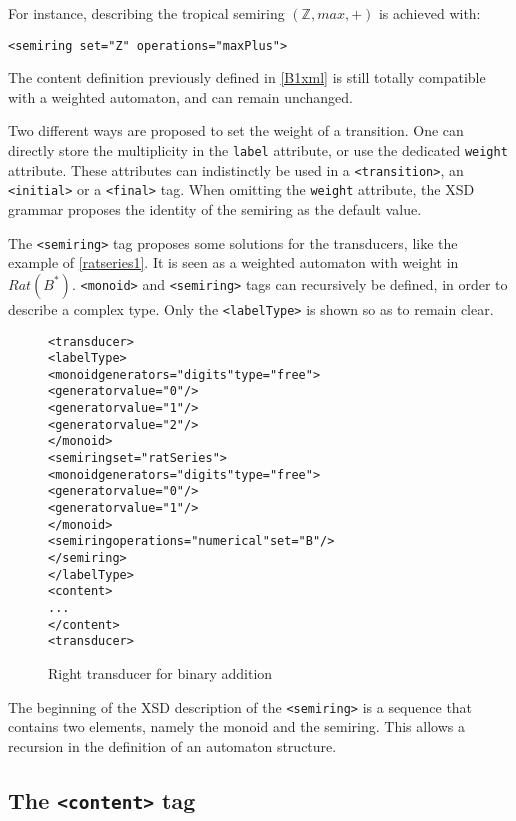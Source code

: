 \documentclass[a4paper]{article}
\newcommand{\xtag}[1]{\texttt{<#1>}}
\newcommand{\xattr}[1]{\texttt{#1}}
\begin{document}
For instance, describing the tropical semiring $({\mathbb Z}, max, +)$
is achieved with:
\begin{center}
{\small
\verb|<semiring set="Z" operations="maxPlus">|}
\end{center}

The content definition previously defined in \autoref{B1xml} is
still totally compatible with a weighted automaton, and can remain
unchanged.

Two different ways are proposed to set the weight of a transition. One
can directly store the multiplicity in the \xattr{label} attribute, or
use the dedicated \xattr{weight} attribute. These attributes can
indistinctly be used in a \xtag{transition}, an \xtag{initial} or a
\xtag{final} tag. When omitting the \xattr{weight} attribute, the XSD
grammar proposes the identity of the semiring as the default value.

\medskip

The \xtag{semiring} tag proposes some solutions for the transducers,
like the example of \autoref{ratseries1}. It is seen as a weighted automaton
with weight in $Rat(B^*)$. \xtag{monoid} and \xtag{semiring} tags can
recursively be defined, in order to describe a complex type. Only the
\xtag{labelType} is shown so as to remain clear.

\begin{figure}[ht]
  \begin{center}
\begin{alltt}
<transducer>
  <labelType>
    <monoid generators="digits" type="free">
      <generator value="0"/>
      <generator value="1"/>
      <generator value="2"/>
    </monoid>
    <semiring set="ratSeries">
      <monoid generators="digits" type="free">
        <generator value="0"/>
        <generator value="1"/>
      </monoid>
      <semiring operations="numerical" set="B"/>
    </semiring>
  </labelType>
  <content>
    ...
  </content>
<transducer>
\end{alltt}
\caption{Right transducer for binary addition}
\label{ratseries1}
  \end{center}
\end{figure}

The beginning of the XSD description of the \xtag{semiring} is a sequence that
contains two elements, namely the monoid and the semiring. This allows a
recursion in the definition of an automaton structure.

\subsection{The \xtag{content} tag}
\end{document}
